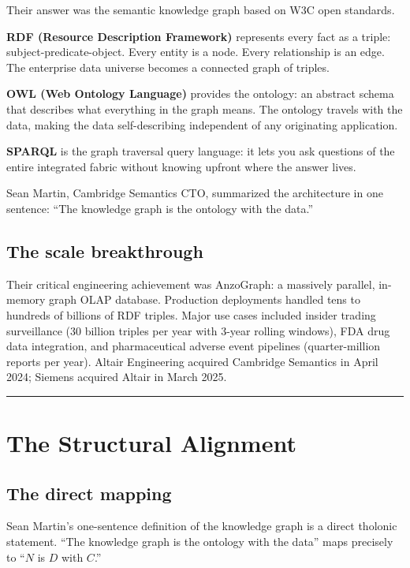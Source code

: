 \documentclass[12pt]{article}
\begin{document}
Their answer was the semantic knowledge graph based on W3C open
standards.

\textbf{RDF (Resource Description Framework)} represents every fact as a
triple: subject-predicate-object. Every entity is a node. Every
relationship is an edge. The enterprise data universe becomes a
connected graph of triples.

\textbf{OWL (Web Ontology Language)} provides the ontology: an abstract
schema that describes what everything in the graph means. The ontology
travels with the data, making the data self-describing independent of
any originating application.

\textbf{SPARQL} is the graph traversal query language: it lets you ask
questions of the entire integrated fabric without knowing upfront where
the answer lives.

Sean Martin, Cambridge Semantics CTO, summarized the architecture in one
sentence: ``The knowledge graph is the ontology with the data.''

\subsection{The scale breakthrough}\label{the-scale-breakthrough}

Their critical engineering achievement was AnzoGraph: a massively
parallel, in-memory graph OLAP database. Production deployments handled
tens to hundreds of billions of RDF triples. Major use cases included
insider trading surveillance (30 billion triples per year with 3-year
rolling windows), FDA drug data integration, and pharmaceutical adverse
event pipelines (quarter-million reports per year). Altair Engineering
acquired Cambridge Semantics in April 2024; Siemens acquired Altair in
March 2025.

\begin{center}\rule{0.5\linewidth}{0.5pt}\end{center}

\section{The Structural Alignment}\label{the-structural-alignment}

\subsection{The direct mapping}\label{the-direct-mapping}

Sean Martin's one-sentence definition of the knowledge graph is a direct
tholonic statement. ``The knowledge graph is the ontology with the
data'' maps precisely to ``\(N\) is \(D\) with \(C\).''
\end{document}
